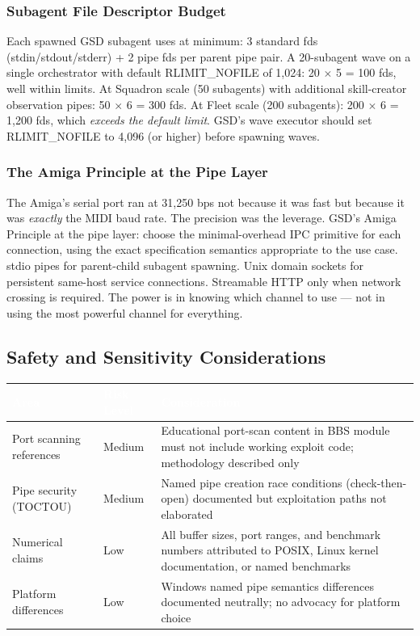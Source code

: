 \documentclass[11pt,letterpaper]{article}
\newcommand{\tableheader}[1]{\textbf{\sffamily\textcolor{white}{#1}}}
\begin{document}
\subsubsection{Subagent File Descriptor Budget}

Each spawned GSD subagent uses at minimum: 3 standard fds (stdin/stdout/stderr) + 2 pipe fds per parent pipe pair. A 20-subagent wave on a single orchestrator with default RLIMIT\_NOFILE of 1,024: 20 $\times$ 5 = 100 fds, well within limits. At Squadron scale (50 subagents) with additional skill-creator observation pipes: 50 $\times$ 6 = 300 fds. At Fleet scale (200 subagents): 200 $\times$ 6 = 1,200 fds, which \textit{exceeds the default limit}. GSD's wave executor should set RLIMIT\_NOFILE to 4,096 (or higher) before spawning waves.

\subsubsection{The Amiga Principle at the Pipe Layer}

The Amiga's serial port ran at 31,250 bps not because it was fast but because it was \textit{exactly} the MIDI baud rate. The precision was the leverage. GSD's Amiga Principle at the pipe layer: choose the minimal-overhead IPC primitive for each connection, using the exact specification semantics appropriate to the use case. stdio pipes for parent-child subagent spawning. Unix domain sockets for persistent same-host service connections. Streamable HTTP only when network crossing is required. The power is in knowing which channel to use --- not in using the most powerful channel for everything.

\subsection{Safety and Sensitivity Considerations}

\begin{center}
\begin{tabularx}{\textwidth}{L{3cm}L{2cm}X}
\toprule
{}
\tableheader{Area} & \tableheader{Risk Level} & \tableheader{Consideration} \\
\midrule
Port scanning references & Medium & Educational port-scan content in BBS module must not include working exploit code; methodology described only \\
Pipe security (TOCTOU) & Medium & Named pipe creation race conditions (check-then-open) documented but exploitation paths not elaborated \\
Numerical claims & Low & All buffer sizes, port ranges, and benchmark numbers attributed to POSIX, Linux kernel documentation, or named benchmarks \\
Platform differences & Low & Windows named pipe semantics differences documented neutrally; no advocacy for platform choice \\
\bottomrule
\end{tabularx}
\end{center}
\end{document}
